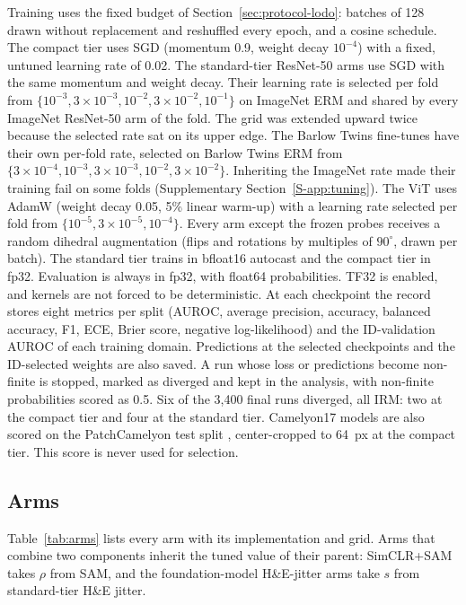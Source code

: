Training uses the fixed budget of Section~\ref{sec:protocol-lodo}: batches of
128 drawn without replacement and reshuffled every epoch, and a cosine schedule.
The compact tier uses SGD (momentum 0.9, weight decay $10^{-4}$) with a fixed,
untuned learning rate of 0.02. The standard-tier ResNet-50 arms use SGD with
the same momentum and weight decay. Their learning rate is selected per fold
from $\{10^{-3},3\times10^{-3},10^{-2},3\times10^{-2},10^{-1}\}$ on ImageNet
ERM and shared by every ImageNet ResNet-50 arm of the fold. The grid was extended
upward twice because the selected rate sat on its upper edge. The Barlow Twins
fine-tunes have their own per-fold rate, selected on Barlow Twins ERM from
$\{3\times10^{-4},10^{-3},3\times10^{-3},10^{-2},3\times10^{-2}\}$. Inheriting
the ImageNet rate made their training fail on some folds
(Supplementary Section~\ref{S-app:tuning}). The ViT uses
AdamW (weight decay 0.05, 5\% linear warm-up) with a learning rate selected per
fold from $\{10^{-5},3\times10^{-5},10^{-4}\}$. Every arm except the frozen
probes receives a random dihedral augmentation (flips and rotations by
multiples of $90^\circ$, drawn per batch). The standard tier trains in
bfloat16 autocast and the compact tier in fp32. Evaluation is always in fp32,
with float64 probabilities. TF32 is enabled, and kernels are not forced to be
deterministic. At each checkpoint the record stores eight metrics per split
(AUROC, average precision, accuracy, balanced accuracy, F1, ECE, Brier score,
negative log-likelihood) and the ID-validation AUROC of each training domain.
Predictions at the selected checkpoints and the ID-selected weights are also
saved. A run whose loss or predictions become non-finite is stopped, marked as
diverged and kept in the analysis, with non-finite probabilities scored as 0.5.
Six of the 3,400 final runs diverged, all IRM: two at the compact tier and
four at the standard tier. Camelyon17 models are also scored on the
PatchCamelyon test split \citep{veeling2018pcam}, center-cropped to 64~px at the
compact tier. This score is never used for selection.

\subsection{Arms}
\label{sec:setup-arms}

Table~\ref{tab:arms} lists every arm with its implementation and grid. Arms
that combine two components inherit the tuned value of their parent:
SimCLR+SAM takes $\rho$ from SAM, and the foundation-model H\&E-jitter arms
take $s$ from standard-tier H\&E jitter.


